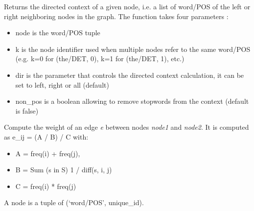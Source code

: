 \documentclass[letterpaper,10pt,english]{sphinxmanual}
\begin{document}
\begin{fulllineitems}
\begin{fulllineitems}
\end{fulllineitems}


\begin{fulllineitems}
\label{index:takahe.word_graph.get_directed_context}
Returns the directed context of a given node, i.e. a list of word/POS of
the left or right neighboring nodes in the graph. The function takes 
four parameters :
\begin{itemize}
\item {} 
node is the word/POS tuple

\item {} 
k is the node identifier used when multiple nodes refer to the same 
word/POS (e.g. k=0 for (the/DET, 0), k=1 for (the/DET, 1), etc.)

\item {} 
dir is the parameter that controls the directed context calculation, 
it can be set to left, right or all (default)

\item {} 
non\_pos is a boolean allowing to remove stopwords from the context 
(default is false)

\end{itemize}

\end{fulllineitems}


\begin{fulllineitems}
\label{index:takahe.word_graph.get_edge_weight}
Compute the weight of an edge \emph{e} between nodes \emph{node1} and \emph{node2}. It 
is computed as e\_ij = (A / B) / C with:
\begin{itemize}
\item {} 
A = freq(i) + freq(j),

\item {} 
B = Sum (s in S) 1 / diff(s, i, j)

\item {} 
C = freq(i) * freq(j)

\end{itemize}

A node is a tuple of (`word/POS', unique\_id).


\end{fulllineitems}
\end{fulllineitems}
\end{document}
